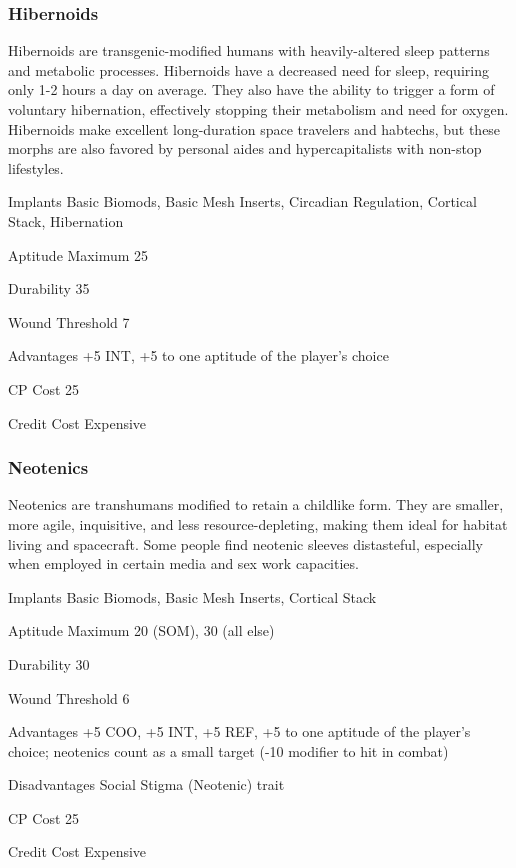 \subsubsection{Hibernoids}
\label{sec:starting-hibernoids}

Hibernoids are transgenic-modified humans with heavily-altered sleep patterns and metabolic processes. Hibernoids have a decreased need for sleep, requiring only 1-2 hours a day on average. They also have the ability to trigger a form of voluntary hibernation, effectively stopping their metabolism and need for oxygen. Hibernoids make excellent long-duration space travelers and habtechs, but these morphs are also favored by personal aides and hypercapitalists with non-stop lifestyles.

\begin{description*}
\item[Implants] Basic Biomods, Basic Mesh Inserts, Circadian Regulation, Cortical Stack, Hibernation
\item[Aptitude Maximum] 25 
\item[Durability] 35 
\item[Wound Threshold] 7 
\item[Advantages] +5 INT, +5 to one aptitude of the player’s choice
\item[CP Cost] 25 
\item[Credit Cost] Expensive 
\end{description*}

\subsubsection{Neotenics}
\label{sec:starting-neonetics}

Neotenics are transhumans modified to retain a childlike form. They are smaller, more agile, inquisitive, and less resource-depleting, making them ideal for habitat living and spacecraft. Some people find neotenic sleeves distasteful, especially when employed in certain media and sex work capacities.

\begin{description*}
\item[Implants] Basic Biomods, Basic Mesh Inserts, Cortical Stack 
\item[Aptitude Maximum] 20 (SOM), 30 (all else) 
\item[Durability] 30 
\item[Wound Threshold] 6 
\item[Advantages] +5 COO, +5 INT, +5 REF, +5 to one aptitude of the player’s choice; neotenics count as a small target (-10 modifier to hit in combat) 
\item[Disadvantages] Social Stigma (Neotenic) trait 
\item[CP Cost] 25 
\item[Credit Cost] Expensive 
\end{description*}

